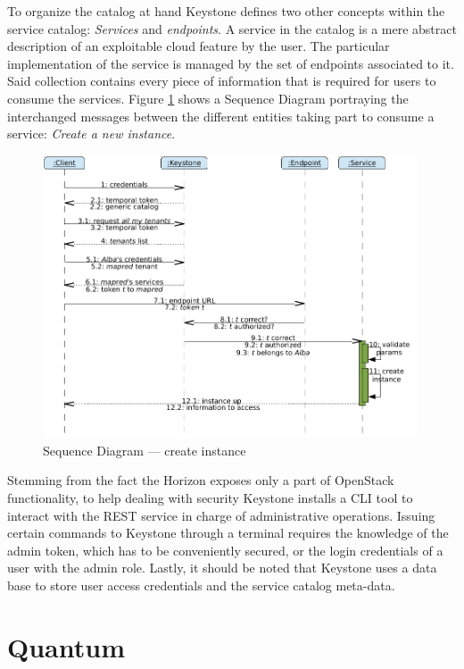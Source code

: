 To organize the catalog at hand Keystone defines two other concepts within the service catalog: \emph{Services} and \emph{endpoints}. A service in the catalog is a mere abstract description of an exploitable cloud feature by the user. The particular implementation of the service is managed by the set of endpoints associated to it. Said collection contains every piece of information that is required for users to consume the services. Figure \ref{fig:secuenciais} shows a Sequence Diagram portraying the interchanged messages between the different entities taking part to consume a service: \emph{Create a new instance}.

\begin{figure}[tbp]
\begin{center}
\includegraphics[width=0.99\textwidth]{imagenes/013.pdf}
 \caption{Sequence Diagram --- create instance}
\label{fig:secuenciais}
\end{center}
\end{figure}

Stemming from the fact the Horizon exposes only a part of OpenStack functionality, to help dealing with security Keystone installs a CLI tool to interact with the REST service in charge of administrative operations. Issuing certain commands to Keystone through a terminal requires the knowledge of the admin token, which has to be conveniently secured, or the login credentials of a user with the admin role. Lastly, it should be noted that Keystone uses a data base to store user access credentials and the service catalog meta-data.

\section{Quantum}\label{sec:quantum}

